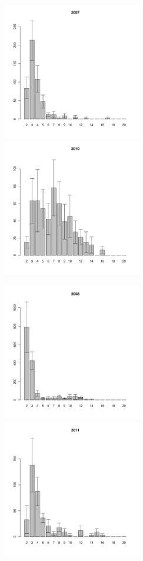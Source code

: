 \documentclass[12pt, a4paper]{article}
\begin{document}

\newpage \begin{figure}[h] 

\begin{multicols}{2}
\hfill
\includegraphics[width=60mm]{../White_Sea/Lomnishniy/Lomnishniy2_2007_.pdf}
\hfill
\includegraphics[width=60mm]{../White_Sea/Lomnishniy/Lomnishniy2_2010_.pdf}
\end{multicols}



\begin{multicols}{2}
\hfill
\includegraphics[width=60mm]{../White_Sea/Lomnishniy/Lomnishniy2_2008_.pdf}
\hfill
\includegraphics[width=60mm]{../White_Sea/Lomnishniy/Lomnishniy2_2011_.pdf}
\end{multicols}


\end{figure}
\end{document}
